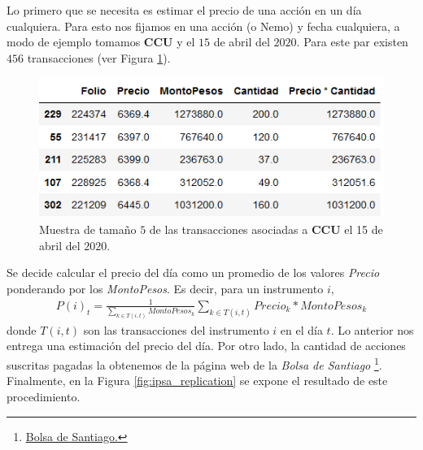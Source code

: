 \documentclass{article}
\begin{document}
   	Lo primero que se necesita es estimar el precio de una acción en un día cualquiera. Para esto nos fijamos en una acción (o Nemo) y fecha cualquiera, a modo de ejemplo tomamos \textbf{CCU} y el $15$ de abril del $2020$. Para este par existen $456$ transacciones (ver Figura \ref{fig:ccu_abril}).   
   	\begin{figure}[H]
   		\centering
   		\includegraphics[scale=.5]{imgs/ccu_abril.png}
   		\caption{Muestra de tamaño $5$ de las transacciones asociadas a \textbf{CCU} el 15 de abril del $2020$.}
   		\label{fig:ccu_abril}
   	\end{figure}
   	Se decide calcular el precio del día como un promedio de los valores \textit{Precio} ponderando por los \textit{MontoPesos}. Es decir, para un instrumento $i$,
   	\begin{align*}
   		P(i)_t = \frac{1}{\sum_{k\in T(i,t)} MontoPesos_k}\sum_{k\in T(i,t)} Precio_k * MontoPesos_k
   	\end{align*}
 	donde $T(i,t)$ son las transacciones del instrumento $i$ en el día $t$. Lo anterior nos entrega una estimación del precio del día. Por otro lado, la cantidad de acciones suscritas pagadas la obtenemos de la página web de la \textit{Bolsa de Santiago} \footnote{\href{https://www.bolsadesantiago.com/}{Bolsa de Santiago.}}. Finalmente, en la Figura \ref{fig:ipsa_replication} se expone el resultado de este procedimiento.
\end{document}
